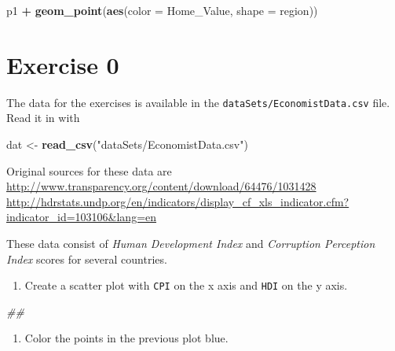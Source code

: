 \documentclass[]{book}
\newenvironment{Shaded}{\begin{snugshade}}{\end{snugshade}}
\newcommand{\CommentTok}[1]{\textcolor[rgb]{0.56,0.35,0.01}{\textit{#1}}}
\newcommand{\DataTypeTok}[1]{\textcolor[rgb]{0.13,0.29,0.53}{#1}}
\newcommand{\KeywordTok}[1]{\textcolor[rgb]{0.13,0.29,0.53}{\textbf{#1}}}
\newcommand{\NormalTok}[1]{#1}
\newcommand{\OperatorTok}[1]{\textcolor[rgb]{0.81,0.36,0.00}{\textbf{#1}}}
\newcommand{\StringTok}[1]{\textcolor[rgb]{0.31,0.60,0.02}{#1}}
\providecommand{\tightlist}{%
  \setlength{\itemsep}{0pt}\setlength{\parskip}{0pt}}
\begin{document}
\begin{Shaded}
\begin{Highlighting}[]
\NormalTok{p1 }\OperatorTok{+}
\StringTok{  }\KeywordTok{geom_point}\NormalTok{(}\KeywordTok{aes}\NormalTok{(}\DataTypeTok{color =}\NormalTok{ Home_Value, }\DataTypeTok{shape =}\NormalTok{ region))}
\end{Highlighting}
\end{Shaded}

\hypertarget{exercise-0-2}{%
\section{Exercise 0}\label{exercise-0-2}}

The data for the exercises is available in the \texttt{dataSets/EconomistData.csv} file. Read it in with

\begin{Shaded}
\begin{Highlighting}[]
\NormalTok{dat <-}\StringTok{ }\KeywordTok{read_csv}\NormalTok{(}\StringTok{"dataSets/EconomistData.csv"}\NormalTok{)}
\end{Highlighting}
\end{Shaded}

Original sources for these data are \url{http://www.transparency.org/content/download/64476/1031428} \url{http://hdrstats.undp.org/en/indicators/display_cf_xls_indicator.cfm?indicator_id=103106\&lang=en}

These data consist of \emph{Human Development Index} and \emph{Corruption Perception Index} scores for several countries.

\begin{enumerate}
\def\labelenumi{\arabic{enumi}.}
\tightlist
\item
  Create a scatter plot with \texttt{CPI} on the x axis and \texttt{HDI} on the y axis.
\end{enumerate}

\begin{Shaded}
\begin{Highlighting}[]
\CommentTok{## }
\end{Highlighting}
\end{Shaded}

\begin{enumerate}
\def\labelenumi{\arabic{enumi}.}
\setcounter{enumi}{1}
\tightlist
\item
  Color the points in the previous plot blue.
\end{enumerate}
\end{document}
